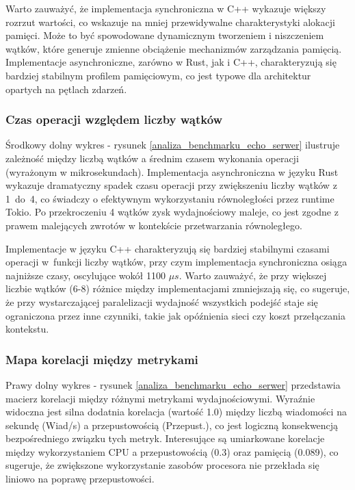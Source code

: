 Warto zauważyć, że implementacja synchroniczna w C++ wykazuje większy rozrzut wartości, co wskazuje na mniej przewidywalne charakterystyki alokacji pamięci. Może to być spowodowane dynamicznym tworzeniem i niszczeniem wątków, które generuje zmienne obciążenie mechanizmów zarządzania pamięcią. Implementacje asynchroniczne, zarówno w Rust, jak i C++, charakteryzują się bardziej stabilnym profilem pamięciowym, co jest typowe dla architektur opartych na pętlach zdarzeń.

\subsubsection{Czas operacji względem liczby wątków}
Środkowy dolny wykres - rysunek \ref{analiza_benchmarku_echo_serwer} ilustruje zależność między liczbą wątków a średnim czasem wykonania operacji (wyrażonym w mikrosekundach). Implementacja asynchroniczna w języku Rust wykazuje dramatyczny spadek czasu operacji przy zwiększeniu liczby wątków z \mbox{1 do 4}, co świadczy o efektywnym wykorzystaniu równoległości przez runtime Tokio. Po przekroczeniu 4 wątków zysk wydajnościowy maleje, co jest zgodne z prawem malejących zwrotów w kontekście przetwarzania równoległego.

Implementacje w języku C++ charakteryzują się bardziej stabilnymi czasami operacji w~funkcji liczby wątków, przy czym implementacja synchroniczna osiąga najniższe czasy, oscylujące wokół 1100 $\mu s$. Warto zauważyć, że przy większej liczbie wątków (6-8) różnice między implementacjami zmniejszają się, co sugeruje, że przy wystarczającej paralelizacji wydajność wszystkich podejść staje się ograniczona przez inne czynniki, takie jak opóźnienia sieci czy koszt przełączania kontekstu.

\subsubsection{Mapa korelacji między metrykami}
Prawy dolny wykres - rysunek \ref{analiza_benchmarku_echo_serwer} przedstawia macierz korelacji między różnymi metrykami wydajnościowymi. Wyraźnie widoczna jest silna dodatnia korelacja (wartość 1.0) między liczbą wiadomości na sekundę (Wiad/s) a przepustowością (Przepust.), co jest logiczną konsekwencją bezpośredniego związku tych metryk. Interesujące są umiarkowane korelacje między wykorzystaniem CPU a przepustowością (0.3) oraz pamięcią (0.089), co sugeruje, że zwiększone wykorzystanie zasobów procesora nie przekłada się liniowo na poprawę przepustowości.

